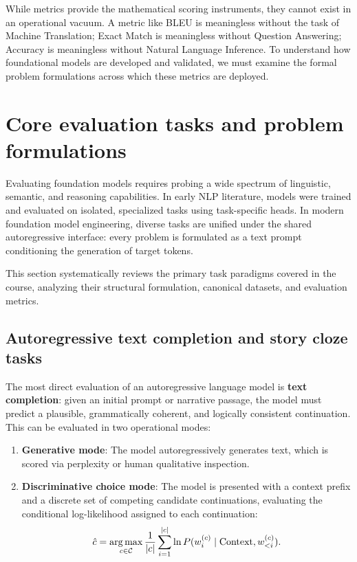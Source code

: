 \documentclass[../../main.tex]{subfiles}
\begin{document}
While metrics provide the mathematical scoring instruments, they cannot exist in an operational vacuum. A metric like BLEU is meaningless without the task of Machine Translation; Exact Match is meaningless without Question Answering; Accuracy is meaningless without Natural Language Inference. To understand how foundational models are developed and validated, we must examine the formal problem formulations across which these metrics are deployed.

\clearpage

\section{Core evaluation tasks and problem formulations}
\label{sec:evaluation_tasks}

Evaluating foundation models requires probing a wide spectrum of linguistic, semantic, and reasoning capabilities. In early NLP literature, models were trained and evaluated on isolated, specialized tasks using task-specific heads. In modern foundation model engineering, diverse tasks are unified under the shared autoregressive interface: every problem is formulated as a text prompt conditioning the generation of target tokens.

This section systematically reviews the primary task paradigms covered in the course, analyzing their structural formulation, canonical datasets, and evaluation metrics.

\subsection{Autoregressive text completion and story cloze tasks}
\label{subsec:text_completion_cloze}

The most direct evaluation of an autoregressive language model is \textbf{text completion}: given an initial prompt or narrative passage, the model must predict a plausible, grammatically coherent, and logically consistent continuation. This can be evaluated in two operational modes:
\begin{enumerate}
    \item \textbf{Generative mode}: The model autoregressively generates text, which is scored via perplexity or human qualitative inspection.
    \item \textbf{Discriminative choice mode}: The model is presented with a context prefix and a discrete set of competing candidate continuations, evaluating the conditional log-likelihood assigned to each continuation:
    \begin{equation}
    \label{eq:discriminative_choice}
    \hat{c} = \operatorname*{\mathrm{arg\,max}}_{c \in \mathcal{C}} \frac{1}{|c|} \sum_{i=1}^{|c|} \ln P(w_i^{(c)} \mid \text{Context}, w_{<i}^{(c)}).
    \end{equation}
\end{enumerate}
\end{document}
